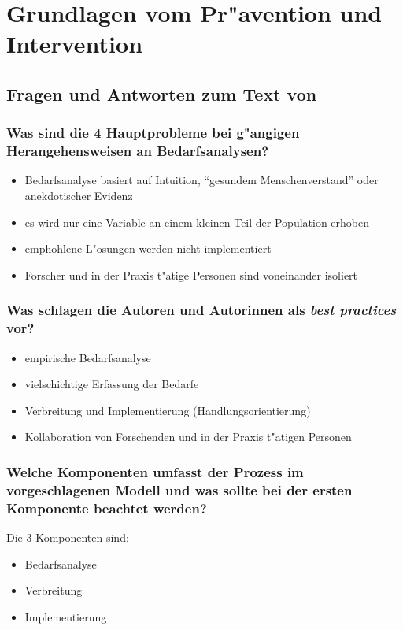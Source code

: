 \section{Grundlagen vom Pr"avention und Intervention}

\subsection{Fragen und Antworten zum Text von \textcite{finifter_comprehensive_2005}}
\subsubsection{Was sind die 4 Hauptprobleme bei g"angigen Herangehensweisen an Bedarfsanalysen?}
\begin{itemize}
        \item Bedarfsanalyse basiert auf Intuition, ``gesundem Menschenverstand'' oder anekdotischer Evidenz
        \item es wird nur eine Variable an einem kleinen Teil der Population erhoben
        \item emphohlene L"osungen werden nicht implementiert
        \item Forscher und in der Praxis t"atige Personen sind voneinander isoliert
\end{itemize}

\subsubsection{Was schlagen die Autoren und Autorinnen als \emph{best practices} vor?}
\begin{itemize}
        \item empirische Bedarfsanalyse
        \item vielschichtige Erfassung der Bedarfe
        \item Verbreitung und Implementierung (Handlungsorientierung)
        \item Kollaboration von Forschenden und in der Praxis t"atigen Personen
\end{itemize}

\subsubsection{Welche Komponenten umfasst der Prozess im vorgeschlagenen Modell und was sollte bei der ersten Komponente beachtet werden?}
Die 3 Komponenten sind:
\begin{itemize}
        \item Bedarfsanalyse
        \item Verbreitung
        \item Implementierung
\end{itemize}

